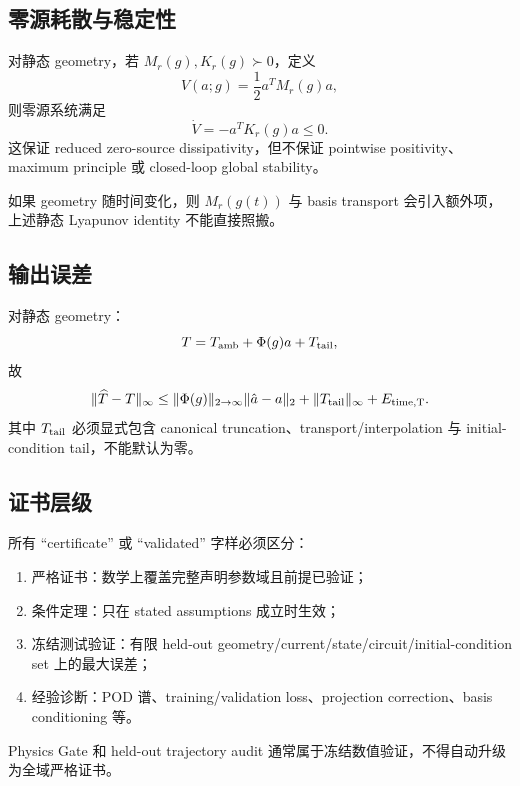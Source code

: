 \subsection{零源耗散与稳定性}
对静态 geometry，若 $M_r(g),K_r(g)\succ0$，定义
\begin{equation}
V(a;g)=\frac12a^TM_r(g)a,
\end{equation}
则零源系统满足
\begin{equation}
\dot V=-a^TK_r(g)a\le0.
\end{equation}
这保证 reduced zero-source dissipativity，但不保证 pointwise positivity、maximum principle 或 closed-loop global stability。

如果 geometry 随时间变化，则 $M_r(g(t))$ 与 basis transport 会引入额外项，上述静态 Lyapunov identity 不能直接照搬。

\subsection{输出误差}
对静态 geometry：
\begin{equation}
T=T_{\rm amb}+\Phi(g)a+T_{\rm tail},
\end{equation}
故
\begin{equation}
\|\widehat T-T\|_\infty
\le\|\Phi(g)\|_{2\to\infty}\|\hat a-a\|_2
+\|T_{\rm tail}\|_\infty
+E_{\rm time,T}.
\end{equation}
其中 $T_{\rm tail}$ 必须显式包含 canonical truncation、transport/interpolation 与 initial-condition tail，不能默认为零。

\subsection{证书层级}
所有 ``certificate'' 或 ``validated'' 字样必须区分：
\begin{enumerate}
  \item 严格证书：数学上覆盖完整声明参数域且前提已验证；
  \item 条件定理：只在 stated assumptions 成立时生效；
  \item 冻结测试验证：有限 held-out geometry/current/state/circuit/initial-condition set 上的最大误差；
  \item 经验诊断：POD 谱、training/validation loss、projection correction、basis conditioning 等。
\end{enumerate}
Physics Gate 和 held-out trajectory audit 通常属于冻结数值验证，不得自动升级为全域严格证书。
